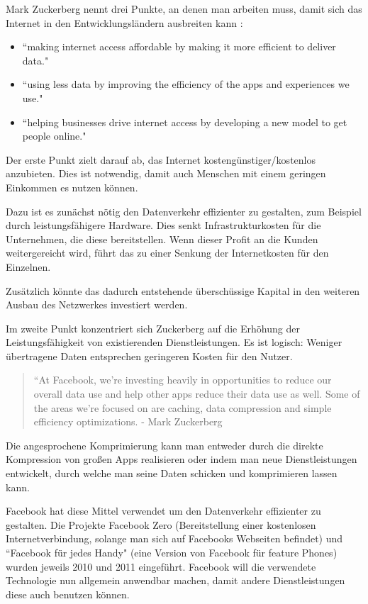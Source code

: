 \documentclass{article}
\begin{document}
Mark Zuckerberg nennt drei Punkte, an denen man arbeiten muss, damit sich das Internet in den Entwicklungsländern ausbreiten kann
\parencite{HumanRight}:

\begin{itemize}
\item ``making internet access affordable by making it more efficient to deliver data."
\item ``using less data by improving the efficiency of the apps and experiences we use."
\item ``helping businesses drive internet access by developing a new model to get people online."  
\end{itemize}

Der erste Punkt zielt darauf ab, das Internet kostengünstiger/kostenlos anzubieten. 
Dies ist notwendig, damit auch Menschen mit einem geringen Einkommen es nutzen können.

Dazu ist es zunächst nötig den Datenverkehr effizienter zu gestalten, zum Beispiel durch leistungsfähigere Hardware.
Dies senkt Infrastrukturkosten für die Unternehmen, die diese bereitstellen.
Wenn dieser Profit an die Kunden weitergereicht wird, führt das zu einer Senkung der Internetkosten für den Einzelnen.

Zusätzlich könnte das dadurch entstehende überschüssige Kapital in den weiteren Ausbau des Netzwerkes investiert werden.

\medskip

Im zweite Punkt konzentriert sich Zuckerberg auf die Erhöhung der Leistungsfähigkeit von existierenden Dienstleistungen.
Es ist logisch: Weniger übertragene Daten entsprechen geringeren Kosten für den Nutzer.

\begin{quote}
``At Facebook, we’re investing heavily in opportunities to reduce our overall data use and help  other apps     
reduce their data use as well. Some of the areas we’re focused on are caching, data compression and simple efficiency optimizations.
- Mark Zuckerberg \textcite[8]{HumanRight}
\end{quote}

Die angesprochene Komprimierung kann man entweder durch die direkte Kompression von großen Apps realisieren oder indem man neue Dienstleistungen entwickelt, durch welche man seine Daten schicken und komprimieren lassen kann.

Facebook hat diese Mittel verwendet um den Datenverkehr effizienter zu gestalten.
Die Projekte Facebook Zero (Bereitstellung einer kostenlosen Internetverbindung, solange man sich auf Facebooks Webseiten befindet) und ``Facebook für jedes Handy" (eine Version von Facebook für feature Phones) wurden jeweils  2010 und 2011 eingeführt.
Facebook will die verwendete Technologie nun allgemein anwendbar machen, damit andere Dienstleistungen diese auch benutzen können.
\end{document}
